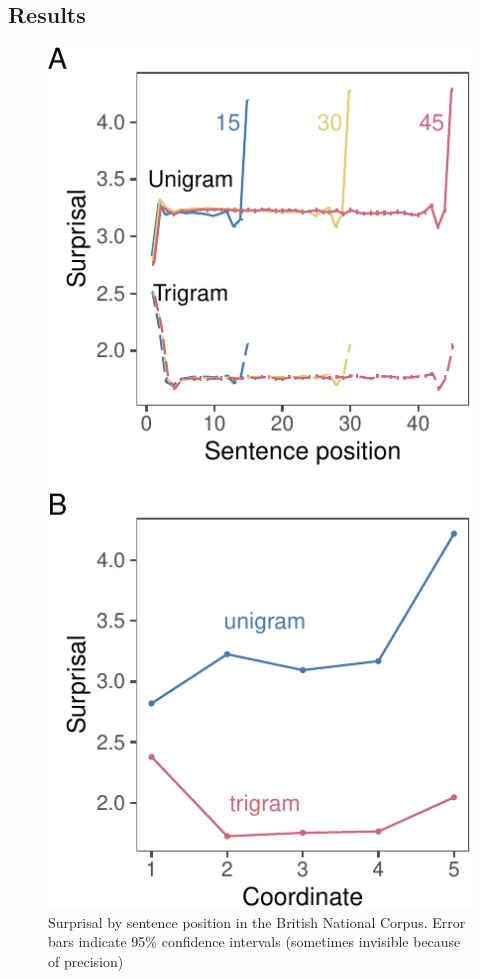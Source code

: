 \documentclass[10pt, letterpaper]{article}
\newenvironment{CodeChunk}{}{}
\begin{document}
\hypertarget{results}{%
\subsection{Results}\label{results}}

\begin{CodeChunk}
\begin{figure}[tb]
\includegraphics{figs/bnc_raw-1} \caption[Surprisal by sentence position in the British National Corpus]{Surprisal by sentence position in the British National Corpus. Error bars indicate 95\% confidence intervals (sometimes invisible because of precision)}\label{fig:bnc_raw}
\end{figure}
\end{CodeChunk}
\end{document}
